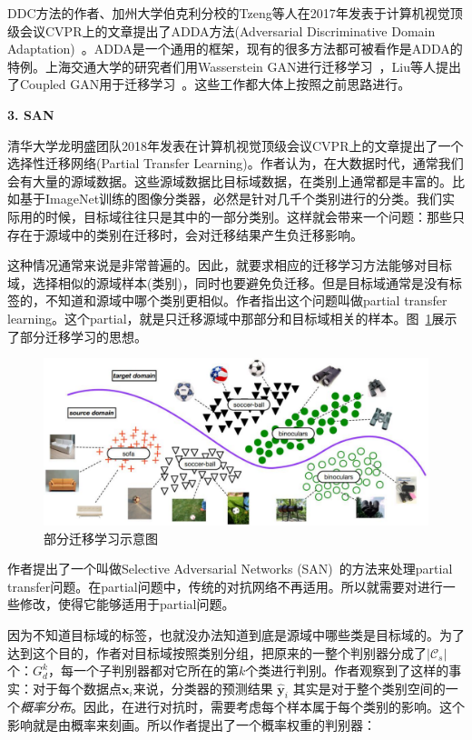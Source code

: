 DDC方法的作者、加州大学伯克利分校的Tzeng等人在2017年发表于计算机视觉顶级会议CVPR上的文章提出了ADDA方法(Adversarial Discriminative Domain Adaptation)~\cite{tzeng2017adversarial}。ADDA是一个通用的框架，现有的很多方法都可被看作是ADDA的特例。上海交通大学的研究者们用Wasserstein GAN进行迁移学习~\cite{shen2018w}，Liu等人提出了Coupled GAN用于迁移学习~\cite{liu2016coupled}。这些工作都大体上按照之前思路进行。

\textbf{3. SAN}

清华大学龙明盛团队2018年发表在计算机视觉顶级会议CVPR上的文章提出了一个选择性迁移网络(Partial Transfer Learning)。作者认为，在大数据时代，通常我们会有大量的源域数据。这些源域数据比目标域数据，在类别上通常都是丰富的。比如基于ImageNet训练的图像分类器，必然是针对几千个类别进行的分类。我们实际用的时候，目标域往往只是其中的一部分类别。这样就会带来一个问题：那些只存在于源域中的类别在迁移时，会对迁移结果产生负迁移影响。

这种情况通常来说是非常普遍的。因此，就要求相应的迁移学习方法能够对目标域，选择相似的源域样本(类别)，同时也要避免负迁移。但是目标域通常是没有标签的，不知道和源域中哪个类别更相似。作者指出这个问题叫做partial transfer learning。这个partial，就是只迁移源域中那部分和目标域相关的样本。图~\ref{fig-deep-partial}展示了部分迁移学习的思想。

\begin{figure}[htbp]
	\centering
	\includegraphics[scale=0.32]{./figures/fig-deep-partial.pdf}
	\caption{部分迁移学习示意图}
	\label{fig-deep-partial}
\end{figure}

作者提出了一个叫做Selective Adversarial Networks (SAN)~\cite{cao2017partial}的方法来处理partial transfer问题。在partial问题中，传统的对抗网络不再适用。所以就需要对进行一些修改，使得它能够适用于partial问题。

因为不知道目标域的标签，也就没办法知道到底是源域中哪些类是目标域的。为了达到这个目的，作者对目标域按照类别分组，把原来的一整个判别器分成了$|\mathcal{C}_s|$个：$G^k_d$，每一个子判别器都对它所在的第$k$个类进行判别。作者观察到了这样的事实：对于每个数据点$\mathbf{x}_i$来说，分类器的预测结果 $\hat{\mathbf{y}}_i$ 其实是对于整个类别空间的一个\textit{概率分布}。因此，在进行对抗时，需要考虑每个样本属于每个类别的影响。这个影响就是由概率来刻画。所以作者提出了一个概率权重的判别器：

